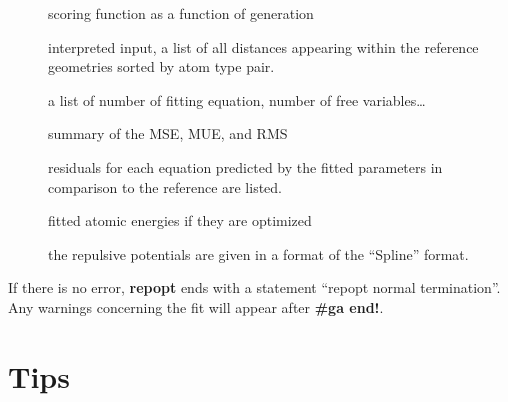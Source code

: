 \begin{description}
  \item[] scoring function as a function of generation
  \item[] interpreted input, a list of all distances 
                                     appearing within the reference geometries 
                                     sorted by atom type pair.
  \item[] a list of number of fitting equation, number 
                                     of free variables\dots 
  \item[] summary of the MSE, MUE, and RMS
  \item[] residuals for each equation predicted by the 
                                     fitted parameters in comparison to the 
                                     reference are listed.
  \item[] fitted atomic energies if they are optimized 
  \item[] the repulsive potentials are given in a 
                                     format of the ``Spline'' format.
\end{description}

If there is no error, \textbf{repopt} ends with a statement ``repopt normal
termination''.  Any warnings concerning the fit will appear after
\textbf{\#ga end!}.

\section{Tips}
